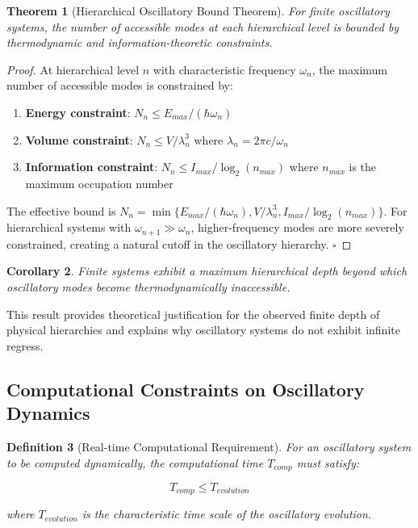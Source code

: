 \documentclass[11pt]{article}
\newtheorem{theorem}{Theorem}[section]
\newtheorem{corollary}[theorem]{Corollary}
\newtheorem{definition}[theorem]{Definition}
\theoremstyle{remark}
\begin{document}
\begin{theorem}[Hierarchical Oscillatory Bound Theorem]
For finite oscillatory systems, the number of accessible modes at each hierarchical level is bounded by thermodynamic and information-theoretic constraints.
\end{theorem}

\begin{proof}
At hierarchical level $n$ with characteristic frequency $\omega_n$, the maximum number of accessible modes is constrained by:

\begin{enumerate}
\item \textbf{Energy constraint}: $N_n \leq E_{max}/(\hbar\omega_n)$
\item \textbf{Volume constraint}: $N_n \leq V/\lambda_n^3$ where $\lambda_n = 2\pi c/\omega_n$
\item \textbf{Information constraint}: $N_n \leq I_{max}/\log_2(n_{max})$ where $n_{max}$ is the maximum occupation number
\end{enumerate}

The effective bound is $N_n = \min\{E_{max}/(\hbar\omega_n), V/\lambda_n^3, I_{max}/\log_2(n_{max})\}$. For hierarchical systems with $\omega_{n+1} \gg \omega_n$, higher-frequency modes are more severely constrained, creating a natural cutoff in the oscillatory hierarchy. $\square$
\end{proof}

\begin{corollary}
Finite systems exhibit a maximum hierarchical depth beyond which oscillatory modes become thermodynamically inaccessible.
\end{corollary}

This result provides theoretical justification for the observed finite depth of physical hierarchies and explains why oscillatory systems do not exhibit infinite regress.

\subsection{Computational Constraints on Oscillatory Dynamics}

\begin{definition}[Real-time Computational Requirement]
For an oscillatory system to be computed dynamically, the computational time $T_{comp}$ must satisfy:

$$T_{comp} \leq T_{evolution}$$

where $T_{evolution}$ is the characteristic time scale of the oscillatory evolution.
\end{definition}
\end{document}
